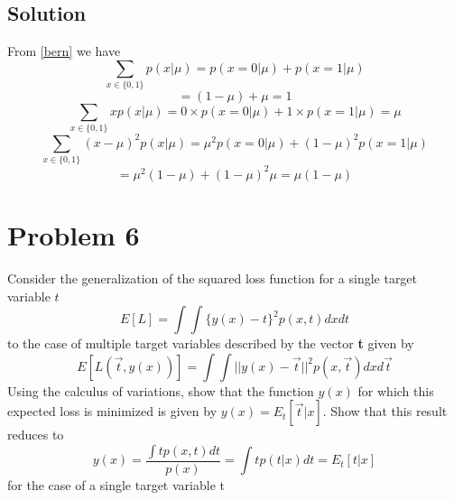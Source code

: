 \documentclass[a4 paper]{article}
\numberwithin{equation}{section}
\newcommand{\0}{\mathbf{0}}
\begin{document}
\subsection*{Solution}
$ $\\
From \ref{bern} we have
\begin{equation}
\sum_{x\in\{0,1\}}p(x|\mu) = p(x=0|\mu)+p(x=1|\mu)
\end{equation}
\begin{equation}
= (1-\mu)+\mu = 1
\end{equation}
\begin{equation}
\sum_{x\in\{0,1\}}xp(x|\mu) = 0\times p(x=0|\mu)+1\times p(x=1|\mu) = \mu
\end{equation}
\begin{equation}
\sum_{x\in \{0,1\}}(x-\mu)^2p(x|\mu) = \mu^2p(x=0|\mu) + (1-\mu)^2p(x=1|\mu)
\end{equation}
\begin{equation}
= \mu^2(1-\mu)+(1-\mu)^2\mu = \mu(1-\mu)
\end{equation}

\section*{Problem 6}
Consider the generalization of the squared loss function for a single target variable $t$ 
\begin{equation}
E[L] = \int\int\{y(x)-t\}^2p(x,t)dxdt
\end{equation}
to the case of multiple target variables described by the vector
\textbf{t} given by
\begin{equation}
E[L(\overrightarrow{t},y(x))] = \int\int ||y(x)-\overrightarrow{t}||^2p(x,\overrightarrow{t})dxd\overrightarrow{t}
\end{equation}
Using the calculus of variations, show that the function $y(x)$ for which this expected loss is minimized is given by $y(x) = E_t[\overrightarrow{t}|x]$. Show that this result reduces to
\begin{equation}
y(x) = \frac{\int tp(x,t)dt}{p(x)}= \int tp(t|x)dt = E_t[t|x]
\end{equation}
for the case of a single target variable t
\end{document}
